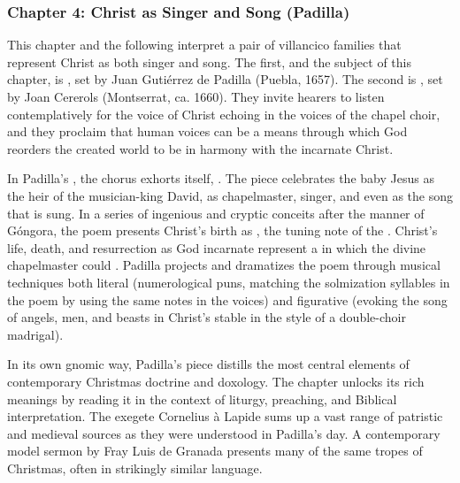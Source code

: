 \documentclass{vcbook-proposal}
\begin{document}
\subsubsection{Chapter 4: Christ as Singer and Song (Padilla)}

This chapter and the following interpret a pair of villancico families that represent Christ as both singer and song.
The first, and the subject of this chapter, is , set by Juan Gutiérrez de Padilla (Puebla, 1657).
The second is , set by Joan Cererols (Montserrat, ca. 1660).
They invite hearers to listen contemplatively for the voice of Christ echoing in the voices of the chapel choir, and they proclaim that human voices can be a means through which God reorders the created world to be in harmony with the incarnate Christ.

In Padilla's , the chorus exhorts itself, .
The piece celebrates the baby Jesus as the heir of the musician-king David, as chapelmaster, singer, and even as the song that is sung.
In a series of ingenious and cryptic conceits after the manner of Góngora, the poem presents Christ's birth as , the tuning note of the .
Christ's life, death, and resurrection as God incarnate represent a  in which the divine chapelmaster could .
Padilla projects and dramatizes the poem through musical techniques both literal (numerological puns, matching the solmization syllables in the poem by using the same notes in the voices) and figurative (evoking the song of angels, men, and beasts in Christ's stable in the style of a double-choir madrigal).

In its own gnomic way, Padilla's piece distills the most central elements of contemporary Christmas doctrine and doxology.
The chapter unlocks its rich meanings by reading it in the context of liturgy, preaching, and Biblical interpretation.
The exegete Cornelius à Lapide sums up a vast range of patristic and medieval sources as they were understood in Padilla's day. 
A contemporary model sermon by Fray Luis de Granada presents many of the same tropes of Christmas, often in strikingly similar language.
\end{document}

